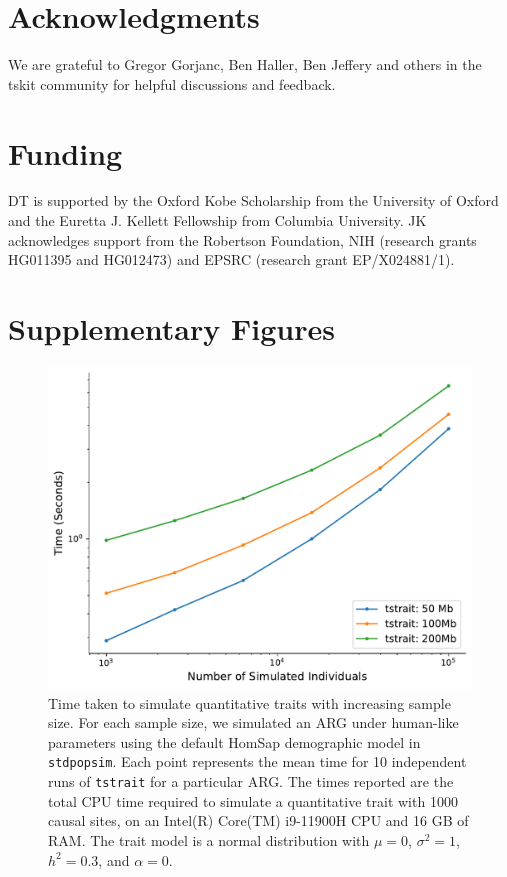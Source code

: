 \documentclass[unnumsec,webpdf,modern,large,namedate]{oup-authoring-template}%
\begin{document}
\section{Acknowledgments}
We are grateful to Gregor Gorjanc, Ben Haller, Ben Jeffery and
others in the tskit community for helpful discussions and feedback.

\section{Funding}
DT is supported by the Oxford Kobe Scholarship from the University of Oxford
and the Euretta J. Kellett Fellowship from Columbia University.
JK acknowledges support from the Robertson Foundation,
NIH (research grants HG011395 and HG012473) and
EPSRC (research grant EP/X024881/1).






\renewcommand\thefigure{S\arabic{figure}}
\setcounter{figure}{0}
\renewcommand\thetable{S\arabic{table}}
\setcounter{table}{0}
\section{Supplementary Figures}

\begin{figure}[h]%
\centering
\includegraphics[width=\columnwidth]{figures/stdpopsim-time.pdf}
\caption{Time taken to simulate quantitative traits with increasing
sample size. For each sample size, we simulated an ARG under human-like
parameters using the default HomSap demographic model in \texttt{stdpopsim}.
Each point represents the mean time for 10 independent runs of \texttt{tstrait}
for a particular ARG. The times reported are the total CPU
time required to simulate a quantitative trait with 1000 causal sites,
on an Intel(R) Core(TM) i9-11900H CPU and 16 GB of RAM.
The trait model is a normal distribution with $\mu=0$,
$\sigma^2=1$, $h^2=0.3$, and $\alpha=0$.
}\label{fig:time}
\end{figure}
\end{document}
